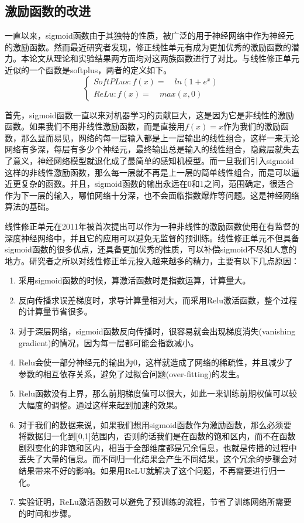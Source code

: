 	\subsection{激励函数的改进}
		
		一直以来，sigmoid函数由于其独特的性质，被广泛的用于神经网络中作为神经元的激励函数。然而最近研究者发现，修正线性单元有成为更加优秀的激励函数的潜力。本论文从理论和实验结果两方面均对这两族函数进行了对比。与线性修正单元近似的一个函数是softplus，两者的定义如下。
		\begin{equation}
		\begin{cases}
		SoftPLus: f(x) = \quad ln(1 + e^x) \\
		ReLu:  f(x) = \quad max(x, 0)
		\end{cases}
		\end{equation}
		
		首先，sigmoid函数一直以来对机器学习的贡献巨大，这是因为它是非线性的激励函数。如果我们不用非线性激励函数，而是直接用$f(x) = x$作为我们的激励函数，那么显而易见，网络的每一层输入都是上一层输出的线性组合，这样一来无论网络有多深，每层有多少个神经元，最终输出总是输入的线性组合，隐藏层就失去了意义，神经网络模型就退化成了最简单的感知机模型。而一旦我们引入sigmoid这样的非线性激励函数，那么每一层就不再是上一层的简单线性组合，而是可以逼近更复杂的函数。并且，sigmoid函数的输出永远在0和1之间，范围确定，很适合作为下一层的输入，哪怕网络十分深，也不会面临指数爆炸等问题。这是神经网络算法的基础。
		
		线性修正单元在2011年被首次提出可以作为一种非线性的激励函数使用在有监督的深度神经网络中，并且它的应用可以避免无监督的预训练。线性修正单元不但具备sigmoid函数的很多优点，还具备更加优秀的性质，可以补偿sigmoid不尽如人意的地方。研究者之所以对线性修正单元投入越来越多的精力，主要有以下几点原因：
		\begin{enumerate}
		\item 采用sigmoid函数的时候，算激活函数时是指数运算，计算量大。
		\item 反向传播求误差梯度时，求导计算量相对大，而采用Relu激活函数，整个过程的计算量节省很多。
		\item 对于深层网络，sigmoid函数反向传播时，很容易就会出现梯度消失(vanishing gradient)的情况，因为每一层都可能会指数减小。
		\item Relu会使一部分神经元的输出为0，这样就造成了网络的稀疏性，并且减少了参数的相互依存关系，避免了过拟合问题(over-fitting)的发生。
		\item Relu函数没有上界，那么前期梯度值可以很大，如此一来训练前期权值可以较大幅度的调整。通过这样来起到加速的效果。
		\item 对于我们的数据来说，如果我们想用sigmoid函数作为激励函数，那么必须要将数据归一化到[0,1]范围内，否则的话我们是在函数的饱和区内，而不在函数剧烈变化的非饱和区内，相当于全部维度都是冗余信息，也就是传播的过程中丢失了大量的信息。而不同归一化结果会产生不同结果，这个冗余的步骤会对结果带来不好的影响。如果用ReLU就解决了这个问题，不再需要进行归一化。
		\item 实验证明，ReLu激活函数可以避免了预训练的流程，节省了训练网络所需要的时间和步骤。
		
		\end{enumerate}
		
